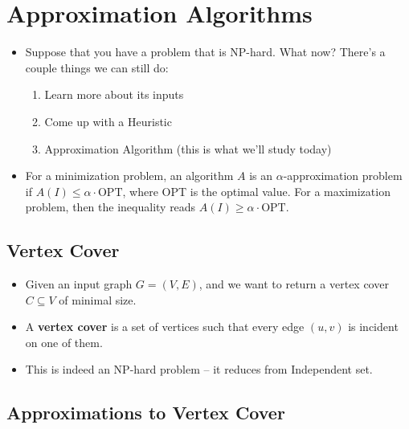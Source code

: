 \section{Approximation Algorithms}
\begin{itemize}
	\item Suppose that you have a problem that is NP-hard. What now? There's a couple things 
		we can still do:
		\begin{enumerate}[label=\arabic*.]
			\item Learn more about its inputs 
			\item Come up with a Heuristic
			\item Approximation Algorithm (this is what we'll study today)
		\end{enumerate}
	\item For a minimization problem, an algorithm \( A \) is an \( \alpha \)-approximation problem 
		if \( A(I) \le \alpha \cdot \text{OPT} \), where OPT is the optimal value. For a maximization 
		problem, then the inequality reads \( A(I) \ge \alpha \cdot \text{OPT} \). 
\end{itemize}
\subsection{Vertex Cover}
\begin{itemize}
	\item Given an input graph \( G = (V, E) \), and we want to return a vertex cover \( C \subseteq V \) of 
		minimal size. 
	\item A \textbf{vertex cover} is a set of vertices such that every edge \( (u, v) \) is incident on 
		one of them.
	\item This is indeed an NP-hard problem -- it reduces from Independent set.  

\end{itemize}
\subsection{Approximations to Vertex Cover}

